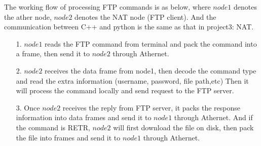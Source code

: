 \documentclass[11pt, conference]{IEEEtran}
\begin{document}
    The working flow of processing FTP commands is as below, where $node1$ denotes the ather node,
    $node2$ denotes the NAT node (FTP client). And the communication between C++ and python is the same as that
    in project3: NAT.
    \begin{enumerate}
        \item [1.] $node1$ reads the FTP command from terminal and pack the command into a frame, then send it
        to $node2$ through Athernet.
        \item [2.] $node2$ receives the data frame from node1, then decode the command type and read the extra information (username, password, file path,etc)
        Then it will process the command locally and send request to the FTP server.
        \item [3.] Once $node2$ receives the reply from FTP server, it packs the response information into data frames and send it to $node1$ through Athernet.
        And if the command is RETR, $node2$ will first download the file on disk, then pack the file into frames and send it to $node1$ through Athernet.  
    \end{enumerate}
\clearpage

\end{document}
